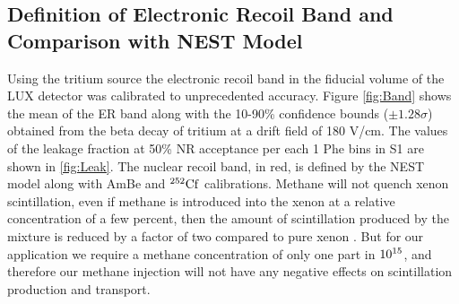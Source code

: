 \subsection{Definition of Electronic Recoil Band and Comparison with NEST Model}

Using the tritium source the electronic recoil band in the fiducial volume of the LUX detector was calibrated to unprecedented accuracy. Figure \ref{fig:Band} shows the mean of the ER band along with the 10-90\% confidence bounds ($\pm 1.28\sigma$) obtained from the beta decay of tritium at a drift field of 180 V/cm. The values of the leakage fraction at 50\% NR acceptance per each 1 Phe bins in S1 are shown in \ref{fig:Leak}. The nuclear recoil band, in red, is defined by the NEST model along with AmBe and $\rm^{252}Cf$  calibrations. Methane will not quench xenon scintillation,  even if methane is introduced into the xenon at a relative concentration of a few percent, then the amount of scintillation produced by the mixture is reduced by a factor of two compared to pure xenon \cite{Kirill_Methane}. But for our application we require a methane concentration of only one part in $\rm10^{15}$, and therefore our methane injection will not have any negative effects on scintillation production and transport.

